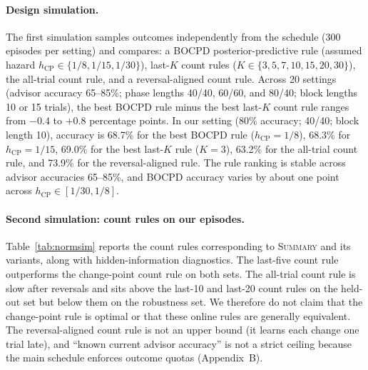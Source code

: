 \documentclass[letterpaper]{article} %
\newcommand{\Summary}{\textsc{Summary}}
\begin{document}
\paragraph{Design simulation.} The first simulation samples outcomes independently from the schedule (300 episodes per setting) and compares: a BOCPD posterior-predictive rule (assumed hazard $h_{\mathrm{CP}} \in \{1/8, 1/15, 1/30\}$), last-$K$ count rules ($K \in \{3,5,7,10,15,20,30\}$), the all-trial count rule, and a reversal-aligned count rule. Across 20 settings (advisor accuracy 65--85\%; phase lengths 40/40, 60/60, and 80/40; block lengths 10 or 15 trials), the best BOCPD rule minus the best last-$K$ count rule ranges from $-0.4$ to $+0.8$ percentage points. In our setting (80\% accuracy; 40/40; block length 10), accuracy is 68.7\% for the best BOCPD rule ($h_{\mathrm{CP}}=1/8$), 68.3\% for $h_{\mathrm{CP}}=1/15$, 69.0\% for the best last-$K$ rule ($K=3$), 63.2\% for the all-trial count rule, and 73.9\% for the reversal-aligned rule. The rule ranking is stable across advisor accuracies 65--85\%, and BOCPD accuracy varies by about one point across $h_{\mathrm{CP}}\in[1/30,1/8]$.

\paragraph{Second simulation: count rules on our episodes.} Table~\ref{tab:normsim} reports the count rules corresponding to \Summary{} and its variants, along with hidden-information diagnostics. The last-five count rule outperforms the change-point count rule on both sets. The all-trial count rule is slow after reversals and sits above the last-10 and last-20 count rules on the held-out set but below them on the robustness set. We therefore do not claim that the change-point rule is optimal or that these online rules are generally equivalent. The reversal-aligned count rule is not an upper bound (it learns each change one trial late), and ``known current advisor accuracy'' is not a strict ceiling because the main schedule enforces outcome quotas (Appendix~B).
\end{document}
